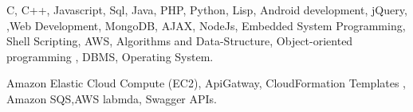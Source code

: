



\begin{cventries}

\cvproject
{
    \begin{cvitems} %
        \item {C, C++, Javascript, Sql, Java, PHP, Python, Lisp, Android development, jQuery, ,Web Development, MongoDB, AJAX, NodeJs, Embedded System Programming, Shell Scripting, AWS, Algorithms and Data-Structure, Object-oriented programming , DBMS, Operating System.}
        \item { Amazon Elastic Cloud Compute (EC2), ApiGatway, CloudFormation Templates , Amazon SQS,AWS labmda, Swagger APIs. }
        \end{cvitems}
}

\end{cventries}